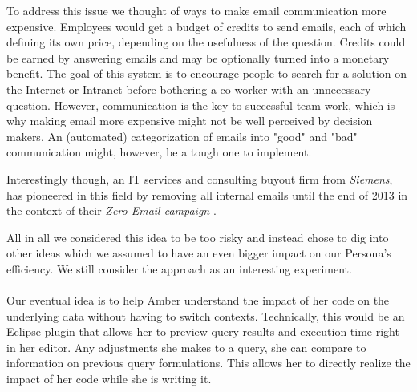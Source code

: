 To address this issue we thought of ways to make email communication more expensive. Employees would get a budget of credits to send emails, each of which defining its own price, depending on the usefulness of the question. Credits could be earned by answering emails and may be optionally turned into a monetary benefit.
The goal of this system is to encourage people to search for a solution on the Internet or Intranet before bothering a co-worker with an unnecessary question.
However, communication is the key to successful team work, which is why making email more expensive might not be well perceived by decision makers. An (automated) categorization of emails into "good" and "bad" communication might, however, be a tough one to implement.

Interestingly though, an IT services and consulting buyout firm from \emph{Siemens}, has pioneered in this field by removing all internal emails until the end of 2013 in the context of their \emph{Zero Email campaign} \cite{zero_email}.

All in all we considered this idea to be too risky and instead chose to dig into other ideas which we assumed to have an even bigger impact on our Persona's efficiency. We still consider the approach as an interesting experiment.

\paragraph{}
Our eventual idea is to help Amber understand the impact of her code on the underlying data without having to switch contexts. Technically, this would be an Eclipse plugin that allows her to preview query results and execution time right in her editor. Any adjustments she makes to a query, she can compare to information on previous query formulations. This allows her to directly realize the impact of her code while she is writing it.